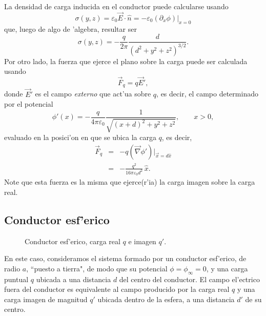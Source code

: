 La densidad de carga inducida en el conductor puede calcularse usando
\begin{equation}
 \sigma(y,z)=\varepsilon_0
\vec{E}\cdot\hat{n}=-\varepsilon_0\left.(\partial_x\phi)\right|_{x=0}
\end{equation}
que, luego de algo de 'algebra, resultar ser
\begin{equation}
 \sigma(y,z)=-\frac{q}{2\pi}\frac{d}{(d^2+y^2+z^2)^{3/2}}.
\end{equation}
Por otro lado, la fuerza que ejerce el plano sobre la carga puede ser calculada usando
\begin{equation}
\vec{F}_q=q\vec{E}',
\end{equation}
donde $\vec{E}'$ es el campo \textit{externo} que act'ua sobre $q$, es decir, el campo
determinado por el potencial
\begin{equation}
 \phi'(x)=-\frac{q}{4\pi\varepsilon_0}\frac{1}{\sqrt{(x+d)^2+y^2+z^2}},
\qquad x>0,
\end{equation}
evaluado en la posici'on en que se ubica la carga $q$, es decir,
\begin{eqnarray}
 \vec{F}_q&=&-q(\vec{\nabla}\phi')|_{\vec{x}=d\hat{x}} \\
&=&-\frac{q^2}{16\pi\varepsilon_0d^2}\,\hat{x}.
\end{eqnarray}
Note que esta fuerza es la misma que ejerce(r'ia) la carga imagen sobre la carga real.

\subsection{Conductor esf'erico}
\begin{figure}[!h]
\centerline{}
\caption{Conductor esf'erico, carga real $q$ e imagen $q'$.}
\label{ci02}
\end{figure}
En este caso, consideramos el sistema formado por un conductor esf'erico, de radio $a$, ``puesto a tierra", de modo que su potencial $\phi=\phi_\infty=0$, y una carga puntual $q$ ubicada a una distancia $d$ del centro del conductor. El campo el'ectrico fuera del conductor es equivalente al campo producido por la carga real $q$ y una carga imagen de magnitud $q'$ ubicada dentro de la esfera, a una distancia $d'$ de su centro. 

